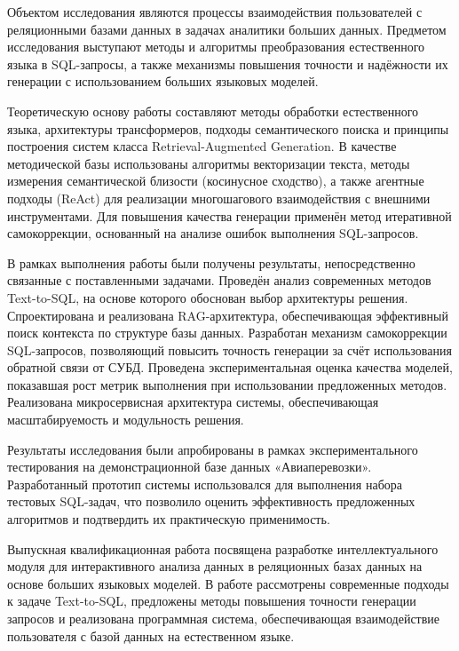 
Объектом исследования являются процессы взаимодействия пользователей с реляционными базами данных в задачах аналитики больших данных. Предметом исследования выступают методы и алгоритмы преобразования естественного языка в SQL-запросы, а также механизмы повышения точности и надёжности их генерации с использованием больших языковых моделей.


Теоретическую основу работы составляют методы обработки естественного языка, архитектуры трансформеров, подходы семантического поиска и принципы построения систем класса Retrieval-Augmented Generation. В качестве методической базы использованы алгоритмы векторизации текста, методы измерения семантической близости (косинусное сходство), а также агентные подходы (ReAct) для реализации многошагового взаимодействия с внешними инструментами. Для повышения качества генерации применён метод итеративной самокоррекции, основанный на анализе ошибок выполнения SQL-запросов.


В рамках выполнения работы были получены результаты, непосредственно связанные с поставленными задачами. Проведён анализ современных методов Text-to-SQL, на основе которого обоснован выбор архитектуры решения. Спроектирована и реализована RAG-архитектура, обеспечивающая эффективный поиск контекста по структуре базы данных. Разработан механизм самокоррекции SQL-запросов, позволяющий повысить точность генерации за счёт использования обратной связи от СУБД. Проведена экспериментальная оценка качества моделей, показавшая рост метрик выполнения при использовании предложенных методов. Реализована микросервисная архитектура системы, обеспечивающая масштабируемость и модульность решения.


Результаты исследования были апробированы в рамках экспериментального тестирования на демонстрационной базе данных «Авиаперевозки». Разработанный прототип системы использовался для выполнения набора тестовых SQL-задач, что позволило оценить эффективность предложенных алгоритмов и подтвердить их практическую применимость.


Выпускная квалификационная работа посвящена разработке интеллектуального модуля для интерактивного анализа данных в реляционных базах данных на основе больших языковых моделей. В работе рассмотрены современные подходы к задаче Text-to-SQL, предложены методы повышения точности генерации запросов и реализована программная система, обеспечивающая взаимодействие пользователя с базой данных на естественном языке.
